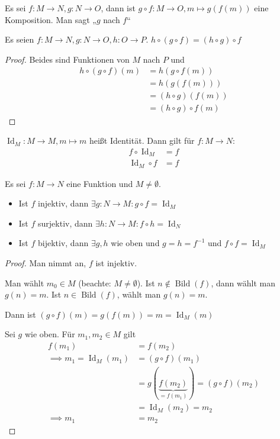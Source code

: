 \begin{definition}
  Es sei $f: M \to N, g: N \to O$, dann ist $g \circ f: M \to O, m \mapsto g(f(m))$ eine Komposition. Man sagt „$g$ nach $f$“
\end{definition}
\begin{lemma}
  Es seien $f: M \to N, g: N \to O, h: O \to P$. $h \circ (g \circ f) = (h \circ g) \circ f$
\end{lemma}
\begin{proof}
  Beides sind Funktionen von $M$ nach $P$ und
  \begin{align*}
    h \circ (g \circ f) (m) &= h (g \circ f (m)) \\
    \, &= h(g(f(m))) \\
    \, &= (h \circ g)(f(m)) \\
    \, &= (h \circ g) \circ f (m)
  \end{align*}
\end{proof}

\begin{remark}
  $\operatorname{Id}_M: M \to M, m \mapsto m$ heißt Identität. Dann gilt für $f: M \to N$:
  \begin{align*}
    f \circ \operatorname{Id}_M &= f \\
    \operatorname{Id}_M \circ f &= f
  \end{align*}
\end{remark}

\begin{theorem}
  Es sei $f: M \to N$ eine Funktion und $M \ne \emptyset$.
  \begin{itemize}
  \item Ist $f$ injektiv, dann $\exists g: N \to M: g \circ f = \operatorname{Id}_M$
  \item Ist $f$ surjektiv, dann $\exists h: N \to M: f \circ h = \operatorname{Id}_N$
  \item Ist $f$ bijektiv, dann $\exists g, h$ wie oben und $g = h = f^{-1}$ und $f \circ f = \operatorname{Id}_M$
  \end{itemize}
\end{theorem}
\begin{proof}
  Man nimmt an, $f$ ist injektiv.

  Man wählt $m_0 \in M$ (beachte: $M \ne \emptyset$). Ist $n \not\in \operatorname{Bild}(f)$, dann wählt man $g(n) = m$. Ist $n \in \operatorname{Bild}(f)$, wählt man $g(n) = m$.

  Dann ist $(g \circ f)(m) = g(f(m)) = m = \operatorname{Id}_M(m)$

  Sei $g$ wie oben. Für $m_1, m_2 \in M$ gilt
  \begin{align*}
    f(m_1) &= f(m_2) \\
    \implies m_1 = \operatorname{Id}_M(m_1) &= (g \circ f)(m_1) \\
    \, &= g(\underbrace{f(m_2)}_{= f(m_{1})}) = (g \circ f)(m_2) \\
    \, &= \operatorname{Id}_M(m_2) = m_2 \\
    \implies m_1 &= m_2
  \end{align*}
\end{proof}